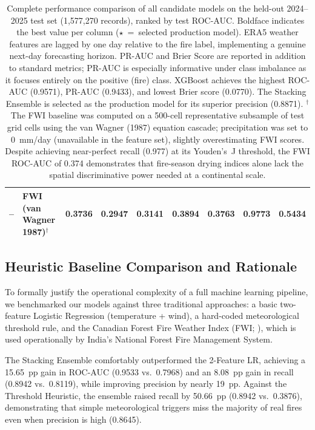 \documentclass[11pt]{article}
\begin{document}
\begin{table}[H]
{\begin{tabular}{clccccccc}
        -- & FWI (van Wagner 1987)$^\dagger$   & 0.3736          & 0.2947          & 0.3141          & 0.3894 & 0.3763          & 0.9773          & 0.5434 \\
        \bottomrule
    \end{tabular}%
    }
    \caption{Complete performance comparison of all candidate models on the held-out 2024--2025 test set (1,577,270 records), ranked by test ROC-AUC. Boldface indicates the best value per column ($\star$~=~selected production model). ERA5 weather features are lagged by one day relative to the fire label, implementing a genuine next-day forecasting horizon. PR-AUC and Brier Score are reported in addition to standard metrics; PR-AUC is especially informative under class imbalance as it focuses entirely on the positive (fire) class. XGBoost achieves the highest ROC-AUC (0.9571), PR-AUC (0.9433), and lowest Brier score (0.0770). The Stacking Ensemble is selected as the production model for its superior precision (0.8871). $^\dagger$The FWI baseline was computed on a 500-cell representative subsample of test grid cells using the van Wagner (1987) equation cascade; precipitation was set to 0~mm/day (unavailable in the feature set), slightly overestimating FWI scores. Despite achieving near-perfect recall (0.977) at its Youden's~J threshold, the FWI ROC-AUC of 0.374 demonstrates that fire-season drying indices alone lack the spatial discriminative power needed at a continental scale.}
\label{tab:model_results}
\end{table}

\subsection{Heuristic Baseline Comparison and Rationale}

To formally justify the operational complexity of a full machine learning pipeline, we benchmarked our models against three traditional approaches: a basic two-feature Logistic Regression (temperature + wind), a hard-coded meteorological threshold rule, and the Canadian Forest Fire Weather Index (FWI; \citealt{vanWagner1987}), which is used operationally by India's National Forest Fire Management System.

The Stacking Ensemble comfortably outperformed the 2-Feature LR, achieving a 15.65~pp gain in ROC-AUC (0.9533 vs.\ 0.7968) and an 8.08~pp gain in recall (0.8942 vs.\ 0.8119), while improving precision by nearly 19~pp. Against the Threshold Heuristic, the ensemble raised recall by 50.66~pp (0.8942 vs.\ 0.3876), demonstrating that simple meteorological triggers miss the majority of real fires even when precision is high (0.8645).
\end{document}
